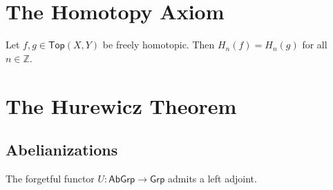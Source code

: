 \section*{The Homotopy Axiom}

\begin{theorem}
	Let $f,g \in \mathsf{Top}(X,Y)$ be freely homotopic. Then $H_n(f) = H_n(g)$ for all $n \in \mathbb{Z}$.
\end{theorem}

\section*{The Hurewicz Theorem}
\subsection*{Abelianizations}

\begin{proposition}
	The forgetful functor $U : \mathsf{AbGrp} \to \mathsf{Grp}$ admits a left adjoint.
	\label{prop:Ab_grp_abgrp}
\end{proposition}

